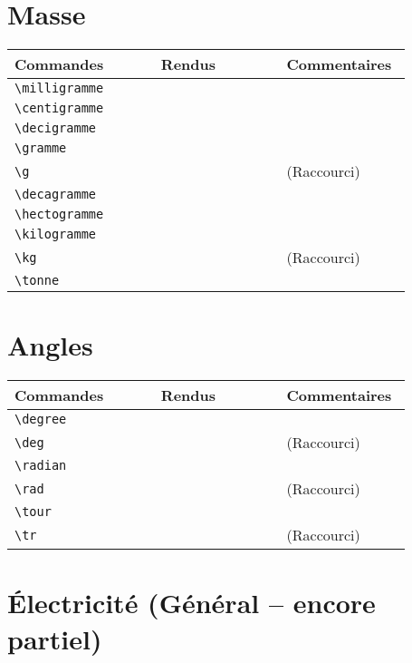 \documentclass[a4paper,12pt]{article}
\newcommand{\rac}{({\color{red}Raccourci})}
\begin{document}
	
	\section{Masse}
	
	\noindent
	\begin{tabular}{|p{0.35\linewidth}|p{0.3\linewidth}|p{0.3\linewidth}|}
		\hline
 			\textbf{Commandes}&\textbf{Rendus}&\textbf{Commentaires}
 		\\\hline\hline
			\verb!\milligramme!	& 	\milligramme	&	\\
		\hline
			\verb!\centigramme!	& 	\centigramme	&	\\
		\hline
			\verb!\decigramme!	& 	\decigramme	&	\\
		\hline
			\verb!\gramme!		& 	\gramme		&	\\
		\hline
			\verb!\g!		& 	\g		&	\rac\\
		\hline
			\verb!\decagramme!	& 	\decagramme	&	\\
		\hline
			\verb!\hectogramme!	& 	\hectogramme		&	\\
		\hline
			\verb!\kilogramme!	& 	\kilogramme		&	\\
		\hline
			\verb!\kg!		& 	\kg		&	\rac\\
		\hline
			\verb!\tonne!		& 	\tonne		&	\\
		\hline
	\end{tabular}
	
	
	\section{Angles}
	
	\noindent
	\begin{tabular}{|p{0.35\linewidth}|p{0.3\linewidth}|p{0.3\linewidth}|}
		\hline
 			\textbf{Commandes}&\textbf{Rendus}&\textbf{Commentaires}
 		\\\hline\hline
			\verb!\degree!	& 	\degree	&	\\
		\hline
			\verb!\deg!	& 	\deg	&	\rac\\
		\hline
			\verb!\radian!	& 	\radian	&	\\
		\hline
			\verb!\rad!	& 	\rad	&	\rac\\
		\hline
			\verb!\tour!	& 	\tour	&	\\
		\hline
			\verb!\tr!	& 	\tr	&	\rac\\
		\hline
	\end{tabular}
	
	\section{Électricité (Général -- encore partiel)}
	
\end{document}
